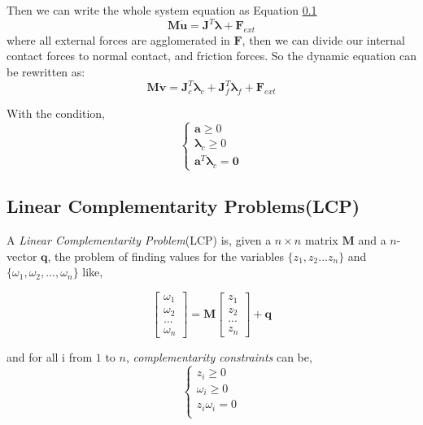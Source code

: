         Then we can write the whole system equation as Equation \ref{}
        \begin{equation}
            \pmb{M}\dot{\mathbf{u}} = \pmb{J}^{T}\pmb{\lambda} + \mathbf{F}_{ext}
         \end{equation}
         where all external forces are agglomerated in $\mathbf{F}$, then we can divide our internal contact forces to normal contact, and friction forces. So the dynamic equation can be rewritten as:
         \begin{equation}
          \pmb{M}\dot{\mathbf{v}} = \pmb{J}_{c}^{T}\pmb{\lambda}_{c} + \pmb{J}^{T}_{f}\pmb{\lambda}_{f} + \mathbf{F}_{ext}
         \end{equation}

        With the condition,
        \begin{equation}
            \begin{cases}
                \pmb{a} \ge 0 \\
                \pmb{\lambda}_{c} \ge 0 \\
                \pmb{a}^{T}\pmb{\lambda}_c = \pmb{0}
            \end{cases}
        \end{equation}

        \subsection{Linear Complementarity Problems(LCP)}
            A \textit{Linear Complementarity Problem}(LCP) is, given a $n \times n$ matrix $\pmb{M}$ and a $n$-vector $\pmb{q}$, the problem of finding values for the variables $\{z_1, z_2 ... z_n\}$ and $\{\omega_1, \omega_2, ... , \omega_n\}$ like,

            \begin{equation}
                \left[\begin{array}{c} \omega_1 \\ \omega_2 \\ ... \\ \omega_n \end{array} \right] = \pmb{M} \left[\begin{array}{c} z_1 \\ z_2 \\ ... \\ z_n \end{array}\right] + \pmb{q}
            \end{equation}

            and for all i from $1$ to $n$, \textit{complementarity constraints} can be,
            \begin{equation}
                \begin{cases}
                    z_i \ge 0 \\
                    \omega_i \ge 0 \\
                    z_i \omega_i = 0 \\
                \end{cases}
            \end{equation}


